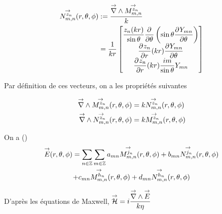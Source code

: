         \begin{align}
        \label{eq:defNnn}
          \Nmn[z_n](\rtp) &:= \frac{\vrot \Mmn[z_n]}{k} \\
          &= \frac{1}{kr}\begin{bmatrix}
            \frac{z_n(kr)}{\sin\theta}\ddr{\theta}{}\left(\sin\theta\ddr{\theta}{Y_{mn}}\right)
            \\
            \ddr{r}{z_n}(kr)\ddr{\theta}{Y_{mn}}
            \\
            \ddr{r}{z_n}(kr)\frac{im}{\sin\theta}Y_{mn}
          \end{bmatrix}
        \end{align}

        Par définition de ces vecteurs, on a les propriétés suivantes
        \begin{prop}
            \label{prop:Mmn_Nmn_rot}
            \begin{align}
                \vrot \Mmn[z_n](\rtp) &= k\Nmn[z_n](\rtp)
                \\
                \vrot \Nmn[z_n](\rtp) &= k\Mmn[z_n](\rtp)
            \end{align}
        \end{prop}



        On a (\cite{cheng_spectral_1993})
        \begin{multline}
            \vE(\rtp) = \sum_{n\in\ZZ}\sum_{m\in\ZZ} a_{mn} \Mmn[j_n](\rtp) + b_{mn} \Nmn[j_n](\rtp)
            \\
            + c_{mn} \Mmn[h_n](\rtp) + d_{mn} \Nmn[h_n](\rtp)
        \end{multline}

        D'après les équations de Maxwell, \(\vH = i\frac{\vrot \vE}{k\eta}\)

